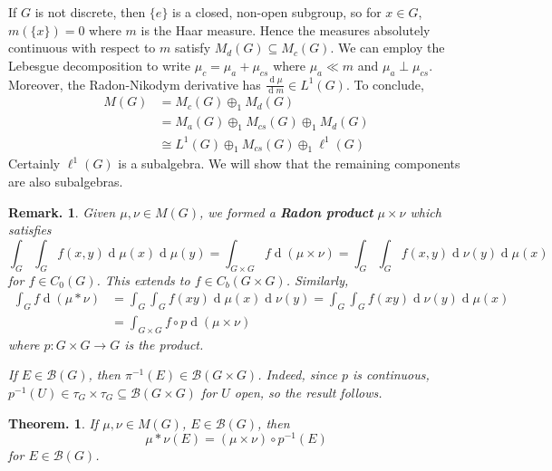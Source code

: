 \documentclass[11pt, a4paper]{memoir}
\theoremstyle{change}
\newtheorem{theorem}{Theorem.}[section]
\theoremstyle{plain}
\theoremstyle{nonumberplain}
\newtheorem{remark}{Remark.}
\renewcommand{\d}[1]{\ensuremath{\operatorname{d}\!{#1}}}
\newcommand{\defn}[1]{{\boldmath\bfseries #1}}
\numberwithin{equation}{section}
\begin{document}
If $G$ is not discrete, then $\{e\}$ is a closed, non-open subgroup, so for $x\in G$, $m(\{x\})=0$ where $m$ is the Haar measure.
Hence the measures absolutely continuous with respect to $m$ satisfy $M_d(G)\subseteq M_c(G)$.
We can employ the Lebesgue decomposition to write $\mu_c=\mu_a+\mu_{cs}$ where $\mu_a\ll m$ and $\mu_a\perp \mu_{cs}$.
Moreover, the Radon-Nikodym derivative has $\frac{\d{\mu}}{\d{m}}\in L^1(G)$.
To conclude,
\begin{align*}
    M(G) &= M_c(G)\oplus_1 M_d(G)\\
         &= M_a(G)\oplus_1 M_{cs}(G)\oplus_1 M_d(G)\\
         &\cong L^1(G)\oplus_1 M_{cs}(G)\oplus_1 \ell^1(G)
\end{align*}
Certainly $\ell^1(G)$ is a subalgebra.
We will show that the remaining components are also subalgebras.
\begin{remark}
    Given $\mu,\nu\in M(G)$, we formed a \defn{Radon product} $\mu\times\nu$ which satisfies
    \begin{equation*}
        \int_G\int_G f(x,y)\d{\mu(x)}\d{\mu(y)}=\int_{G\times G}f\d{(\mu\times\nu)}=\int_G\int_Gf(x,y)\d{\nu(y)}\d{\mu(x)}
    \end{equation*}
    for $f\in C_0(G)$.
    This extends to $f\in C_b(G\times G)$.
    Similarly,
    \begin{align*}
        \int_G f\d{(\mu*\nu)}&=\int_G\int_Gf(xy)\d{\mu(x)}\d{\nu(y)}=\int_G\int_G f(xy)\d{\nu(y)}\d{\mu(x)}\\
                             &=\int_{G\times G}f\circ p\d{(\mu\times\nu)}
    \end{align*}
    where $p:G\times G\to G$ is the product.

    If $E\in\mathcal{B}(G)$, then $\pi^{-1}(E)\in\mathcal{B}(G\times G)$.
    Indeed, since $p$ is continuous, $p^{-1}(U)\in\tau_G\times\tau_G\subseteq\mathcal{B}(G\times G)$ for $U$ open, so the result follows.
\end{remark}
\begin{theorem}
    If $\mu,\nu\in M(G)$, $E\in\mathcal{B}(G)$, then
    \begin{equation*}
        \mu*\nu(E)=(\mu\times\nu)\circ p^{-1}(E)
    \end{equation*}
    for $E\in\mathcal{B}(G)$.
\end{theorem}
\end{document}
